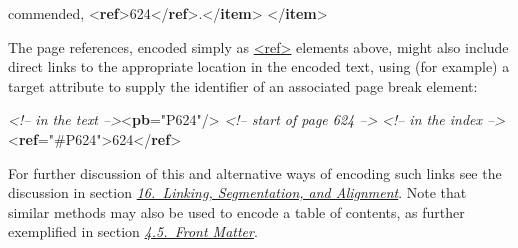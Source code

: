 \begin{shaded}
\hspace*{1em}\hspace*{1em}\hspace*{1em} commended, {<\textbf{ref}>}624{</\textbf{ref}>}.{</\textbf{item}>}\mbox{}\newline 
\hspace*{1em}\hspace*{1em}\mbox{}\newline 
\hspace*{1em}\mbox{}\newline 
{}\mbox{}\newline 
{</\textbf{item}>}\end{shaded}\egroup\par \par
The page references, encoded simply as \hyperref[TEI.ref]{<ref>} elements above, might also include direct links to the appropriate location in the encoded text, using (for example) a target attribute to supply the identifier of an associated page break element: \par\bgroup{}\exampleFont \begin{shaded}\noindent\mbox{}\mbox{}\newline 
\textit{<!-- in the text -->}{<\textbf{pb}\hspace*{1em}{xml:id}="{P624}"/>}\mbox{}\newline 
\textit{<!-- start of  page 624 -->}\mbox{}\newline 
\textit{<!-- in the index -->}\mbox{}\newline 
{<\textbf{ref}\hspace*{1em}{target}="{\#P624}">}624{</\textbf{ref}>}\end{shaded}\egroup\par \noindent  For further discussion of this and alternative ways of encoding such links see the discussion in section \textit{\hyperref[SA]{16.\ Linking, Segmentation, and Alignment}}. Note that similar methods may also be used to encode a table of contents, as further exemplified in section \textit{\hyperref[DSFRONT]{4.5.\ Front Matter}}.
